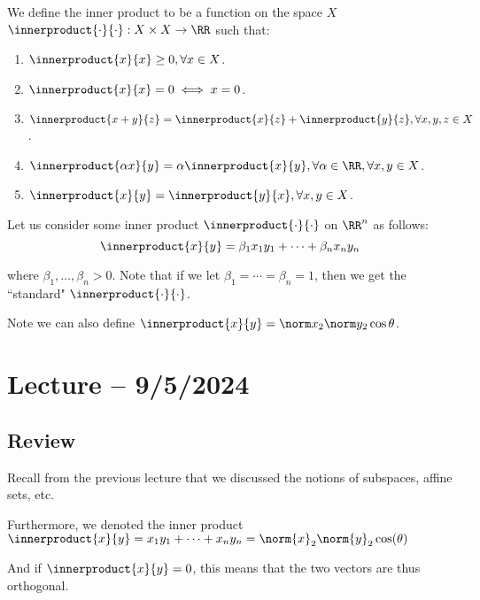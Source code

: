 \documentclass[openany]{book}
\begin{document}
\begin{defn}
	We define the inner product to be a function on the space $X$ $\innerproduct{\cdot}{\cdot}: X \times X \rightarrow \RR$ such that:
	\begin{enumerate}
		\item $\innerproduct{x}{x} \geq 0, \forall x \in X$.
		\item $\innerproduct{x}{x} = 0 \iff x = 0$.
		\item $\innerproduct{x+y}{z} = \innerproduct{x}{z} + \innerproduct{y}{z}, \forall x,y,z \in X$.
		\item $\innerproduct{\alpha x}{y} = \alpha \innerproduct{x}{y}, \forall \alpha \in \RR, \forall x,y \in X$.
		\item $\innerproduct{x}{y} = \innerproduct{y}{x}, \forall x,y \in X$.
	\end{enumerate}
\end{defn}

\begin{example}
	Let us consider some inner product $\innerproduct{\cdot}{\cdot}$ on $\RR^{n}$ as follows:
	\begin{equation*}
		\innerproduct{x}{y} = \beta_1x_1y_1 + \cdots + \beta_nx_ny_n
	\end{equation*}

	where $\beta_1, \ldots, \beta_n > 0$. Note that if we let $\beta_1 = \cdots = \beta_n = 1$, then we get the ``standard" $\innerproduct{\cdot}{\cdot}$.
	
	Note we can also define $\innerproduct{x}{y} = \norm x_2 \norm y_2 \cos \theta$.
\end{example}

\section{Lecture -- 9/5/2024}
\subsection{Review}
Recall from the previous lecture that we discussed the notions of subspaces, affine sets, etc.

Furthermore, we denoted the inner product $\innerproduct{x}{y} = x_1y_1 + \cdots + x_ny_n = \norm{x}_2\norm{y}_2 \cos (\theta)$

And if $\innerproduct{x}{y} = 0$, this means that the two vectors are thus orthogonal.
\end{document}
